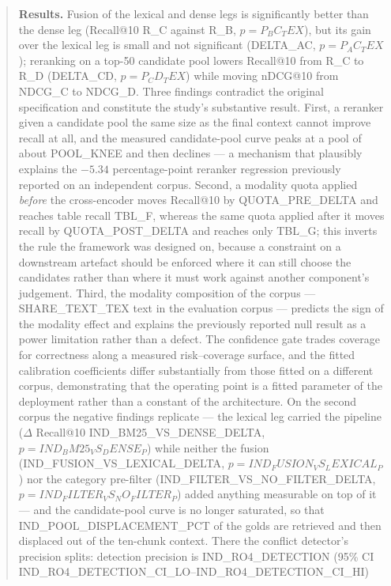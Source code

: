 \documentclass[preprint,3p,times]{elsarticle}
\begin{document}
\begin{abstract}
\textbf{Results.} Fusion of the lexical and dense legs is significantly better
than the dense leg (Recall@10 {{R_C}} against {{R_B}}, $p={{P_BC_TEX}}$), but
its gain over the lexical leg is small and not significant ({{DELTA_AC}},
$p={{P_AC_TEX}}$); reranking on a top-50 candidate pool lowers Recall@10 from
{{R_C}} to {{R_D}} ({{DELTA_CD}}, $p={{P_CD_TEX}}$) while moving nDCG@10 from
{{NDCG_C}} to {{NDCG_D}}. Three findings contradict the original specification
and constitute
the study's substantive result. First, a reranker given a candidate pool the
same size as the final context cannot improve recall at all, and the measured
candidate-pool curve peaks at a pool of about {{POOL_KNEE}} and then declines
--- a mechanism that plausibly explains the $-5.34$ percentage-point reranker
regression previously reported on an independent corpus. Second, a modality
quota applied \emph{before} the cross-encoder moves Recall@10 by
{{QUOTA_PRE_DELTA}} and reaches table recall {{TBL_F}}, whereas the same quota
applied after it moves recall by {{QUOTA_POST_DELTA}} and reaches only
{{TBL_G}}; this inverts the rule the framework was designed on, because a
constraint on a downstream artefact should be enforced where it can still
choose the candidates rather than where it must work against another
component's judgement. Third, the
modality composition of the corpus --- {{SHARE_TEXT_TEX}} text in the evaluation corpus ---
predicts the sign of the modality effect and explains the previously reported
null result as a power limitation rather than a defect. The confidence gate
trades coverage for correctness along a measured risk--coverage surface, and
the fitted calibration coefficients differ substantially from those fitted on a
different corpus, demonstrating that the operating point is a fitted parameter
of the deployment rather than a constant of the architecture. On the second
corpus the negative findings replicate --- the lexical leg carried the pipeline
($\Delta$ Recall@10 {{IND_BM25_VS_DENSE_DELTA}}, $p={{IND_BM25_VS_DENSE_P}}$) while
neither the fusion ({{IND_FUSION_VS_LEXICAL_DELTA}}, $p={{IND_FUSION_VS_LEXICAL_P}}$)
nor the category pre-filter ({{IND_FILTER_VS_NO_FILTER_DELTA}},
$p={{IND_FILTER_VS_NO_FILTER_P}}$) added anything measurable on top of it --- and
the candidate-pool curve is no longer saturated, so that
{{IND_POOL_DISPLACEMENT_PCT}} of the golds are retrieved and then displaced out
of the ten-chunk context. There the conflict detector's precision splits:
detection precision is {{IND_RO4_DETECTION}} (95\% CI {{IND_RO4_DETECTION_CI_LO}}--{{IND_RO4_DETECTION_CI_HI}})

\end{abstract}
\end{document}
